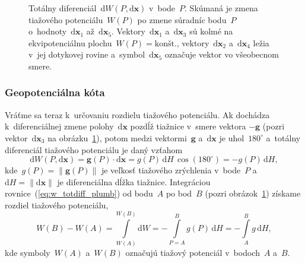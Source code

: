 \documentclass[a4paper, 12pt]{book}
\newcommand{\diff}{\mathrm d}
\let\vec\mathbf
\begin{document}
\begin{figure}
\centering

\caption{Totálny diferenciál~$\diff W(P, \diff \vec x)$ v~bode~$P$.  Skúmaná je 
zmena tiažového potenciálu~$W(P)$ po zmene súradníc bodu~$P$ o~hodnoty~$\diff 
\vec x_1$ až~$\diff \vec x_5$.  Vektory~$\diff \vec x_1$ a~$\diff \vec x_3$ sú 
kolmé na ekvipotenciálnu plochu~$W(P) = \textrm{kon\v{s}t.}$, vektory~$\diff 
\vec x_2$ a~$\diff \vec x_4$ ležia v~jej dotykovej rovine a~symbol~$\diff \vec 
x_5$ označuje vektor vo všeobecnom smere.}
\label{fig:total_differential}
\end{figure}

\subsubsection{Geopotenciálna kóta}
\label{sec:geopotential_number}

Vráťme sa teraz k~určovaniu rozdielu tiažového potenciálu.  Ak dochádza 
k~diferenciálnej zmene polohy~$\diff \vec x$ pozdĺž tiažnice v~smere vektora 
$-\vec g$ (pozri vektor~$\diff \vec x_3$ na 
obrázku~\ref{fig:total_differential}), potom medzi vektormi~$\vec g$ a~$\diff 
\vec x$ je uhol~$180^{\circ}$ a~totálny diferenciál tiažového potenciálu je 
daný vzťahom
%
\begin{equation}
\label{eq:w_totdiff_plumb}
\diff W(P, \diff \vec x) = \vec g(P) \cdot \diff \vec x = g(P) \, \diff H \, 
\cos(180^{\circ}) = -g(P) \, \diff H{,}
\end{equation}
%
kde~$g(P) = \| \vec g(P) \|$ je veľkosť tiažového zrýchlenia v~bode~$P$ 
a~$\diff H = \| \diff \vec x \|$ je diferenciálna dĺžka tiažnice.  Integráciou 
rovnice~(\ref{eq:w_totdiff_plumb}) od bodu~$A$ po bod~$B$ (pozri 
obrázok~\ref{fig:total_differential}) získame rozdiel tiažového potenciálu,
%
\begin{equation}
\label{eq:w_ab}
W(B) - W(A) = \int\limits_{W(A)}^{W(B)} \diff W = -\int\limits_{P = A}^{B} g(P) 
\, \diff H = -\int\limits_{A}^{B} g \, \diff H{,}
\end{equation}
%
kde symboly~$W(A)$ a~$W(B)$ označujú tiažový potenciál v~bodoch~$A$ a~$B$.
\end{document}
